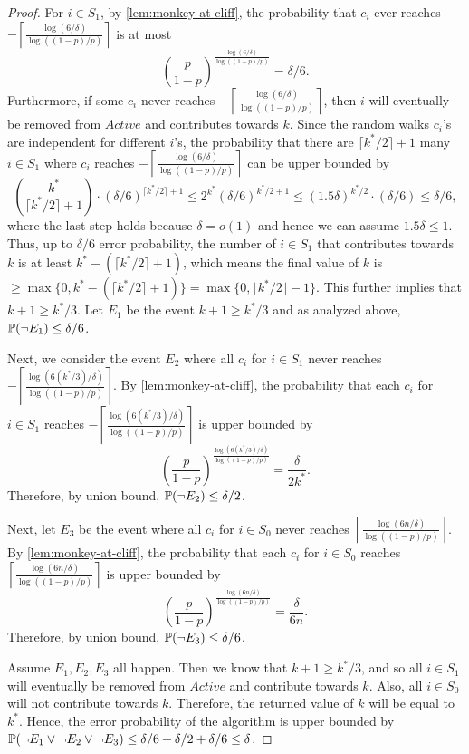 \begin{proof}
For $i \in S_1$, by \cref{lem:monkey-at-cliff}, the probability that $c_i$ ever reaches $-\left\lceil \frac{\log (6 / \delta)}{\log((1-p)/p)} \right\rceil$ is at most
\[
\left( \frac{p}{1-p}\right)^{\frac{\log (6 / \delta)}{\log((1-p)/p)} } = \delta / 6.
\]
Furthermore, if some $c_i$ never reaches $-\left\lceil \frac{\log (6 / \delta)}{\log((1-p)/p)} \right\rceil$, then $i$ will eventually be removed from $Active$ and contributes towards $k$. Since the random walks $c_i$'s are independent for different $i$'s, the probability that there are $\lceil k^* /2 \rceil + 1$ many $i \in S_1$ where  $c_i$ reaches $-\left\lceil \frac{\log (6 / \delta)}{\log((1-p)/p)} \right\rceil$ can be upper bounded by
\[
\binom{k^*}{\lceil k^* /2 \rceil + 1} \cdot (\delta / 6)^{\lceil k^* /2 \rceil + 1} \le 2^{k^*} (\delta / 6)^{ k^* /2  + 1} \le (1.5\delta)^{k^* /2} \cdot (\delta / 6) \le \delta / 6,
\]
where the last step holds because $\delta = o(1)$ and hence we can assume $1.5 \delta \le 1$.
Thus, up to $\delta / 6$ error probability, the number of $i \in S_1$ that contributes towards $k$ is at least $k^* - (\lceil k^* /2 \rceil + 1)$, which means the final value of $k$ is $\ge \max\{0, k^* - (\lceil k^* /2 \rceil + 1)\} = \max\{0, \lfloor k^* / 2 \rfloor - 1\}$. This further implies that $k + 1 \ge k^* / 3$. Let $E_1$ be the event $k + 1 \ge k^* / 3$ and as analyzed above, $\mathbb{P}(\neg E_1) \le \delta / 6$.


Next, we consider the event $E_2$ where all $c_i$ for $i \in S_1$ never reaches $-\left\lceil \frac{\log (6 (k^* / 3) / \delta)}{\log((1-p)/p)} \right\rceil$. By \cref{lem:monkey-at-cliff}, the probability that each $c_i$ for $i \in S_1$ reaches $-\left\lceil \frac{\log (6 (k^* / 3) / \delta)}{\log((1-p)/p)} \right\rceil$ is upper bounded by
\[
\left( \frac{p}{1-p}\right)^{\frac{\log (6 (k^* / 3) / \delta)}{\log((1-p)/p)}} = \frac{\delta}{2 k^*}.
\]
Therefore, by union bound, $\mathbb{P}(\neg E_2) \le \delta /2$.

Next, let $E_3$ be the event where all $c_i$ for $i \in S_0$ never reaches $\left\lceil \frac{\log (6 n / \delta)}{\log((1-p)/p)} \right\rceil$. By \cref{lem:monkey-at-cliff}, the probability that each $c_i$ for $i \in S_0$ reaches $\left\lceil \frac{\log (6 n / \delta)}{\log((1-p)/p)} \right\rceil$ is upper bounded by
\[
\left( \frac{p}{1-p}\right)^{\frac{\log (6 n / \delta)}{\log((1-p)/p)}} = \frac{\delta}{6n}.
\]
Therefore, by union bound, $\mathbb{P}(\neg E_3) \le \delta /6$.

Assume $E_1, E_2, E_3$ all happen. Then we know that $k + 1 \ge k^* / 3$, and so all $i \in S_1$ will eventually be removed from $Active$ and contribute towards $k$. Also, all $i \in S_0$ will not contribute towards $k$. Therefore, the returned value of $k$ will be equal to $k^*$. Hence, the error probability of the algorithm is upper bounded by $\mathbb{P}(\neg E_1 \vee \neg E_2 \vee \neg E_3) \le \delta / 6 + \delta / 2 + \delta / 6 \le \delta$.


\end{proof}
